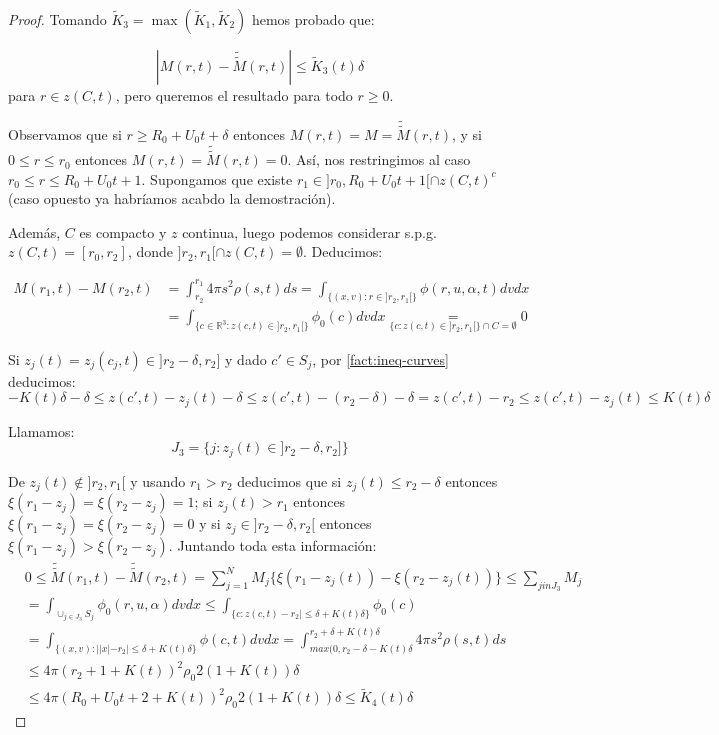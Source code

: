 \documentclass[a4paper,10pt]{scrartcl}
\theoremstyle{definition}
\newcommand{\ktilde}{\widetilde{K}}
\newcommand{\dtilde}[1]{\widetilde{\widetilde{#1}}}
\numberwithin{equation}{section}
\begin{document}
\begin{proof}
 Tomando $\ktilde_3 = \max(\ktilde_1, \ktilde_2)$ hemos probado que:
 
 \begin{equation}
 |M(r,t) - \dtilde{M}(r,t)| \le \ktilde_3(t) \delta
 \label{eqn:m-mdtilde1}
 \end{equation}
 para $r \in z(C,t)$, pero queremos el resultado para todo $r\ge 0$.
 
 Observamos que si $r \ge R_0 + U_0 t + \delta$ entonces $M(r,t) = M = \dtilde{M}(r,t)$, y si $0\le r \le r_0$ entonces $M(r,t) = \dtilde{M}(r,t) = 0$. Así, nos restringimos al caso $r_0 \le r \le R_0 + U_0t + 1$. Supongamos que existe $r_1 \in ]r_0, R_0 + U_0t + 1[ \cap z(C, t)^c$ (caso opuesto ya habríamos acabdo la demostración).
 
 Además, $C$ es compacto y $z$ continua, luego podemos considerar s.p.g. $z(C,t) = [r_0, r_2]$, donde $]r_2,r_1[ \cap z(C,t) = \emptyset$.
 Deducimos:
 
 \begin{align}
  M(r_1, t) - M(r_2, t) &= \int_{r_2}^{r_1} 4\pi s^2 \rho(s,t) ds = \int_{\{(x,v): r\in ]r_2, r_1[\}} \phi(r,u,\alpha,t) dv dx \nonumber\\
  &= \int_{\{c\in\mathbb{R}^3: z(c,t) \in ]r_2, r_1[\}} \phi_0(c) dv dx
  \underset{\{c: z(c,t) \in ]r_2,r_1[\} \cap C = \emptyset}{=} 0
  \label{eqn:mdiff}
 \end{align}
 
 Si $z_j(t) = z_j(c_j,t) \in ]r_2 - \delta, r_2]$ y dado $c'\in S_j$, por \cref{fact:ineq-curves} deducimos:
 \[
 -K(t)\delta -\delta \le z(c',t) - z_j(t) - \delta \le z(c',t) - (r_2 - \delta) - \delta = z(c',t) - r_2 \le z(c',t) - z_j(t) \le K(t)\delta
 \]
 
 Llamamos:
 \[
 J_3 = \{j: z_j(t) \in ]r_2 - \delta, r_2]\}
 \]
 
 De $z_j(t) \notin ]r_2,r_1[$ y usando $r_1 > r_2$ deducimos que si $z_j(t) \le r_2 - \delta$ entonces $\xi(r_1 - z_j) = \xi(r_2 - z_j) = 1$; si $z_j(t) > r_1$ entonces $\xi(r_1 - z_j) = \xi(r_2 - z_j) = 0$ y si $z_j \in ]r_2 - \delta, r_2[$ entonces $\xi(r_1 - z_j) > \xi(r_2 - z_j)$. Juntando toda esta información:
 \begin{align}
 &0 \le \dtilde{M}(r_1,t) - \dtilde{M}(r_2,t) = \sum_{j=1}^N M_j \bigg\{\xi(r_1 - z_j(t)) - \xi(r_2 - z_j(t))\bigg\} \le \sum_{j in J_3} M_j \nonumber\\ 
 &=\int_{\cup_{j\in J_3} S_j} \phi_0(r,u,\alpha) dv dx \le \int_{\{c : z(c,t) - r_2| \le \delta + K(t) \delta\}} \phi_0(c)\\
 &= \int_{\{(x,v): ||x| - r_2| \le \delta + K(t) \delta\}} \phi(c,t) dv dx = \int_{max(0, r_2 - \delta - K(t)\delta}^{r_2 + \delta + K(t) \delta} 4\pi s^2 \rho(s,t) ds \nonumber\\
 &\le 4\pi (r_2 + 1 + K(t))^2 \rho_0 2(1+ K(t))\delta \nonumber\\
 &\le 4\pi (R_0 + U_0t + 2 + K(t))^2 \rho_0 2 (1 + K(t))\delta \le \ktilde_4(t)\delta
 \label{eqn:mtildediff}
 \end{align}


\end{proof}
\end{document}

